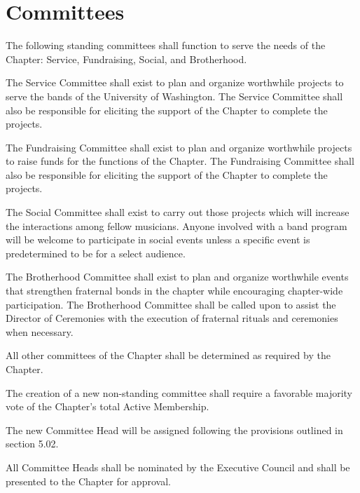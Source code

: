 \documentclass[11pt]{article}
\begin{document}
\section{Committees}
\begin{legal}
  \item
    The following standing committees shall function to serve the needs of the Chapter: Service, Fundraising, Social, and Brotherhood.
    \begin{legal}
      \item 
        The Service Committee shall exist to plan and organize worthwhile projects to serve the bands of the University of Washington.
        The Service Committee shall also be responsible for eliciting the support of the Chapter to complete the projects.
      \item 
        The Fundraising Committee shall exist to plan and organize worthwhile projects to raise funds for the functions of the Chapter.
        The Fundraising Committee shall also be responsible for eliciting the support of the Chapter to complete the projects.
      \item 
        The Social Committee shall exist to carry out those projects which will increase the interactions among fellow musicians.
        Anyone involved with a band program will be welcome to participate in social events unless a specific event is predetermined to be for a select audience.
      \item 
        The Brotherhood Committee shall exist to plan and organize worthwhile events that strengthen fraternal bonds in the chapter while encouraging chapter-wide participation.
        The Brotherhood Committee shall be called upon to assist the Director of Ceremonies with the execution of fraternal rituals and ceremonies when necessary. 
      \item 
        All other committees of the Chapter shall be determined as required by the Chapter.
        \begin{legal}
          \item 
            The creation of a new non-standing committee shall require a favorable majority vote of the Chapter’s total Active Membership.
          \item 
            The new Committee Head will be assigned following the provisions outlined in section 5.02.
        \end{legal}
    \end{legal}
  \item
    All Committee Heads shall be nominated by the Executive Council and shall be presented to the Chapter for approval.

\end{legal}
\end{document}
